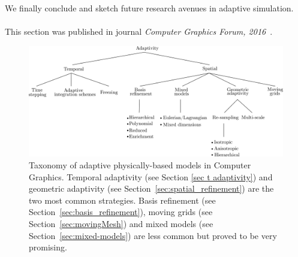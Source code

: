 We finally conclude and sketch future research avenues in adaptive simulation.
\\ \\
This section was published in journal \emph{Computer Graphics Forum, 2016}~\cite{Manteaux2016}.
\begin{figure}[!h]
	\centering
	\includegraphics[width=\linewidth]{images/starAdaptivity-cgf2016/taxonomy.png}
	\caption[STAR adaptivity: Taxonomy]{\label{fig:taxonomy}Taxonomy of adaptive physically-based models in Computer Graphics. Temporal adaptivity (see Section \ref{sec t adaptivity}) and geometric adaptivity (see Section~\ref{sec:spatial_refinement}) are the two most common strategies. Basis refinement (see Section~\ref{sec:basis_refinement}), moving grids (see Section~\ref{sec:movingMesh}) and mixed models (see Section~\ref{sec:mixed-models}) are less common but proved to be very promising.}
\end{figure}

